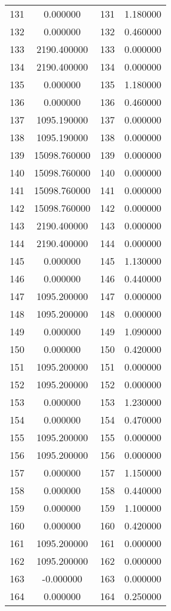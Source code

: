 \documentclass[12pt]{article}
\begin{document}
\begin{longtable}{@{}cccc@{}}
131 & 0.000000 & 131 & 1.180000 \\
132 & 0.000000 & 132 & 0.460000 \\
133 & 2190.400000 & 133 & 0.000000 \\
134 & 2190.400000 & 134 & 0.000000 \\
135 & 0.000000 & 135 & 1.180000 \\
136 & 0.000000 & 136 & 0.460000 \\
137 & 1095.190000 & 137 & 0.000000 \\
138 & 1095.190000 & 138 & 0.000000 \\
139 & 15098.760000 & 139 & 0.000000 \\
140 & 15098.760000 & 140 & 0.000000 \\
141 & 15098.760000 & 141 & 0.000000 \\
142 & 15098.760000 & 142 & 0.000000 \\
143 & 2190.400000 & 143 & 0.000000 \\
144 & 2190.400000 & 144 & 0.000000 \\
145 & 0.000000 & 145 & 1.130000 \\
146 & 0.000000 & 146 & 0.440000 \\
147 & 1095.200000 & 147 & 0.000000 \\
148 & 1095.200000 & 148 & 0.000000 \\
149 & 0.000000 & 149 & 1.090000 \\
150 & 0.000000 & 150 & 0.420000 \\
151 & 1095.200000 & 151 & 0.000000 \\
152 & 1095.200000 & 152 & 0.000000 \\
153 & 0.000000 & 153 & 1.230000 \\
154 & 0.000000 & 154 & 0.470000 \\
155 & 1095.200000 & 155 & 0.000000 \\
156 & 1095.200000 & 156 & 0.000000 \\
157 & 0.000000 & 157 & 1.150000 \\
158 & 0.000000 & 158 & 0.440000 \\
159 & 0.000000 & 159 & 1.100000 \\
160 & 0.000000 & 160 & 0.420000 \\
161 & 1095.200000 & 161 & 0.000000 \\
162 & 1095.200000 & 162 & 0.000000 \\
163 & -0.000000 & 163 & 0.000000 \\
164 & 0.000000 & 164 & 0.250000 \\

\end{longtable}
\end{document}
